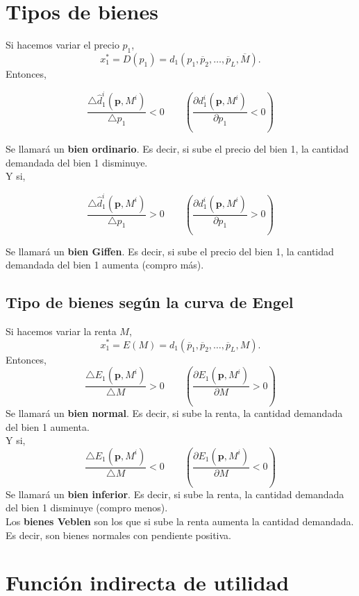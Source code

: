 \section{Tipos de bienes}

Si hacemos variar el precio $p_1$,
$$x_1^* = D(p_1)=d_1(p_1,\overline{p}_2,\ldots,\overline{p}_L,\overline{M}).$$
Entonces,

$$\dfrac{\triangle \hat{d}_1^i\left(\textbf{p},M^i\right)}{\triangle p_1} < 0 \qquad \left(\dfrac{\partial d_1^i\left(\textbf{p},M^i\right)}{\partial p_1}<0\right)$$

Se llamará un \textbf{bien ordinario}. Es decir, si sube el precio del bien 1, la cantidad demandada del bien 1 disminuye.\\

Y si,

$$\dfrac{\triangle \hat{d}_1^i\left(\textbf{p},M^i\right)}{\triangle p_1} > 0 \qquad \left(\dfrac{\partial d_1^i\left(\textbf{p},M^i\right)}{\partial p_1}>0\right)$$

Se llamará un \textbf{bien Giffen}. Es decir, si sube el precio del bien 1, la cantidad demandada del bien 1 aumenta (compro más).\\

\subsection{Tipo de bienes según la curva de Engel}
Si hacemos variar la renta $M$,
$$x_1^* = E(M)=d_1(\overline{p}_1,\overline{p}_2,\ldots,\overline{p}_L,M).$$
Entonces, 
$$\dfrac{\triangle E_1\left(\textbf{p},M^i\right)}{\triangle M} > 0 \qquad \left(\dfrac{\partial E_1\left(\textbf{p},M^i\right)}{\partial M}>0\right)$$
Se llamará un \textbf{bien normal}. Es decir, si sube la renta, la cantidad demandada del bien 1 aumenta.\\
Y si,
$$\dfrac{\triangle E_1\left(\textbf{p},M^i\right)}{\triangle M} < 0 \qquad \left(\dfrac{\partial E_1\left(\textbf{p},M^i\right)}{\partial M}<0\right)$$
Se llamará un \textbf{bien inferior}. Es decir, si sube la renta, la cantidad demandada del bien 1 disminuye (compro menos).\\

Los \textbf{bienes Veblen} son los que si sube la renta aumenta la cantidad demandada. Es decir, son bienes normales con pendiente positiva.\\

\section{Función indirecta de utilidad}

